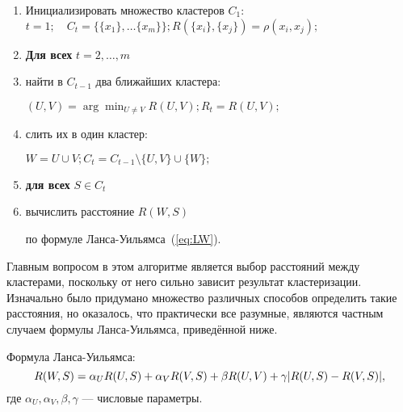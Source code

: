 \documentclass[10pt]{article}
\begin{document}
\begin{enumerate}
	\item Инициализировать множество кластеров $C_1$: \\
		$t=1; \quad C_t = \{\{x_1\}, \dots \{ x_m\}\}; 
		R(\{x_i\}, \{x_j\})=\rho(x_i, x_j);$
	\item \textbf{Для всех} $t=2, \dots, m$
	\item   \quad найти в $C_{t-1}$ два ближайших кластера: 

		\quad $(U, V) = \arg \min_{U \neq V} R(U, V); R_t=R(U, V);$
	\item   \quad слить их в один кластер: 

		\quad $W=U \cup V; C_t=C_{t-1} \setminus \{U, V\} \cup \{W\};$
	\item   \quad \textbf{для всех} $S \in C_t$
	\item     \qquad вычислить расстояние $R(W,S)$ 

		\qquad по формуле Ланса-Уильямса~(\ref{eq:LW}).
	\end{enumerate}

Главным вопросом в этом алгоритме является выбор расстояний между кластерами, поскольку от него сильно зависит результат кластеризации.
Изначально было придумано множество различных способов 
определить такие расстояния, но оказалось, что практически все разумные, являются частным случаем формулы Ланса-Уильямса, приведённой ниже.

	Формула Ланса-Уильямса:
	\begin{equation}
		R(W, S) = \alpha_U R(U, S) + \alpha_V R(V, S) + \\
		\beta R(U, V) + \gamma | R(U,S) - R(V, S) |,
		\label{eq:LW}
	\end{equation}
	где $\alpha_U, \alpha_V, \beta, \gamma$ --- числовые параметры.
\end{document}
